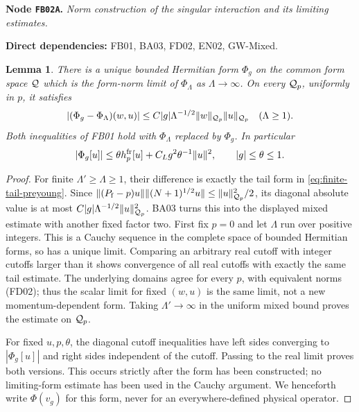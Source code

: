 \documentclass[11pt,a4paper]{article}
\newtheorem{lemma}[theorem]{Lemma}
\theoremstyle{remark}\newtheorem{remark}[theorem]{Remark}
\newcommand{\node}[3]{\par\Needspace{6\baselineskip}\smallskip\hypertarget{node:#1}{}\label{nodepage:#1}\noindent\textbf{Node \texttt{#1}.} \textit{#2.}\par\noindent\textbf{Direct dependencies:} #3.\par}
\begin{document}
\node{FB02A}{Norm construction of the singular interaction and its limiting estimates}{FB01, BA03, FD02, EN02, GW-Mixed}
\begin{lemma}\label{lem:formlimit}\label{lem:ly}
There is a unique bounded Hermitian form $\Phi_g$ on the common form space $\mathcal Q$ which is the form-norm limit of $\Phi_\Lambda$ as $\Lambda\to\infty$. On every $\mathcal Q_p$, uniformly in $p$, it satisfies
\[
 |(\Phi_g-\Phi_\Lambda)(w,u)|
 \leq C|g|\Lambda^{-1/2}\|w\|_{\mathcal Q_p}\|u\|_{\mathcal Q_p}
 \quad(\Lambda\geq1).
\]
Both inequalities of FB01 hold with $\Phi_\Lambda$ replaced by $\Phi_g$. In particular
\begin{equation}
 |\Phi_g[u]|\leq\theta h_p^{\rm fr}[u]
                  +C_Lg^2\theta^{-1}\|u\|^2,
 \qquad |g|\leq\theta\leq1.
 \label{eq:ly}
\end{equation}
\end{lemma}
\begin{proof}
For finite $\Lambda'\geq\Lambda\geq1$, their difference is exactly the tail form in \eqref{eq:finite-tail-preyoung}. Since
$\|(P_{\rm f}-p)u\|\|(N+1)^{1/2}u\|\leq\|u\|_{\mathcal Q_p}^2/2$,
its diagonal absolute value is at most $C|g|\Lambda^{-1/2}\|u\|_{\mathcal Q_p}^2$. BA03 turns this into the displayed mixed estimate with another fixed factor two. First fix $p=0$ and let $\Lambda$ run over positive integers. This is a Cauchy sequence in the complete space of bounded Hermitian forms, so has a unique limit. Comparing an arbitrary real cutoff with integer cutoffs larger than it shows convergence of all real cutoffs with exactly the same tail estimate. The underlying domains agree for every $p$, with equivalent norms (FD02); thus the scalar limit for fixed $(w,u)$ is the same limit, not a new momentum-dependent form. Taking $\Lambda'\to\infty$ in the uniform mixed bound proves the estimate on $\mathcal Q_p$.

For fixed $u,p,\theta$, the diagonal cutoff inequalities have left sides converging to $|\Phi_g[u]|$ and right sides independent of the cutoff. Passing to the real limit proves both versions. This occurs strictly after the form has been constructed; no limiting-form estimate has been used in the Cauchy argument. We henceforth write $\Phi(v_g)$ for this form, never for an everywhere-defined physical operator.
\end{proof}
\end{document}
